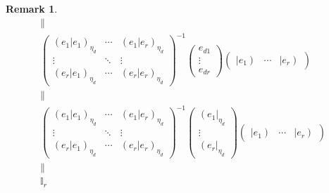 \documentclass[aps,preprint]{revtex4}
\newtheorem{remark}[theorem]{Remark}
\begin{document}
\begin{remark}
\begin{gather}
\parallel \\
\left( 
\begin{array}{ccc}
\left( \left. e_{1}\right\vert e_{1}\right) _{\eta _{d}} & \cdots & \left(
\left. e_{1}\right\vert e_{r}\right) _{\eta _{d}} \\ 
\vdots & \ddots & \vdots \\ 
\left( \left. e_{r}\right\vert e_{1}\right) _{\eta _{d}} & \cdots & \left(
\left. e_{r}\right\vert e_{r}\right) _{\eta _{d}}%
\end{array}%
\right) ^{-1}\left( 
\begin{array}{c}
e_{d1} \\ 
\vdots \\ 
e_{dr}%
\end{array}%
\right) \left( 
\begin{array}{ccc}
\left\vert e_{1}\right) & \cdots & \left\vert e_{r}\right)%
\end{array}%
\right) \\
\parallel \\
\left( 
\begin{array}{ccc}
\left( \left. e_{1}\right\vert e_{1}\right) _{\eta _{d}} & \cdots & \left(
\left. e_{1}\right\vert e_{r}\right) _{\eta _{d}} \\ 
\vdots & \ddots & \vdots \\ 
\left( \left. e_{r}\right\vert e_{1}\right) _{\eta _{d}} & \cdots & \left(
\left. e_{r}\right\vert e_{r}\right) _{\eta _{d}}%
\end{array}%
\right) ^{-1}\left( 
\begin{array}{c}
\left( e_{1}\right\vert _{\eta _{d}} \\ 
\vdots \\ 
\left( e_{r}\right\vert _{\eta _{d}}%
\end{array}%
\right) \left( 
\begin{array}{ccc}
\left\vert e_{1}\right) & \cdots & \left\vert e_{r}\right)%
\end{array}%
\right) \\
\parallel \\
\mathbb{I}_{r}
\end{gather}
\end{remark}
\end{document}
